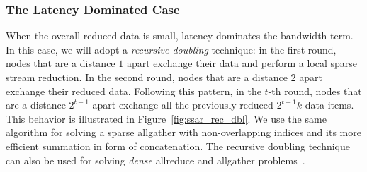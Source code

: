 \documentclass[11pt]{article}
\begin{document}
\subsubsection{The Latency Dominated Case} 

When the overall reduced data is small, latency dominates the bandwidth
term. In this case, we will adopt a \emph{recursive doubling} technique:
in the first round, nodes that are a distance $1$ apart exchange their
data and perform a local sparse stream reduction. In the second round,
nodes that are a distance $2$ apart exchange their reduced data.
Following this pattern, in the $t$-th round, nodes that are a distance
$2^{t-1}$ apart exchange all the previously reduced $2^{t-1}k$ data
items. This behavior is illustrated in Figure~\ref{fig:ssar_rec_dbl}. We
use the same algorithm for solving a sparse allgather with
non-overlapping indices and its more efficient summation in form of concatenation.
The recursive doubling technique can also be used for solving \emph{dense}
allreduce and allgather problems~\cite{hoefler-moor-collectives}. 
\end{document}
